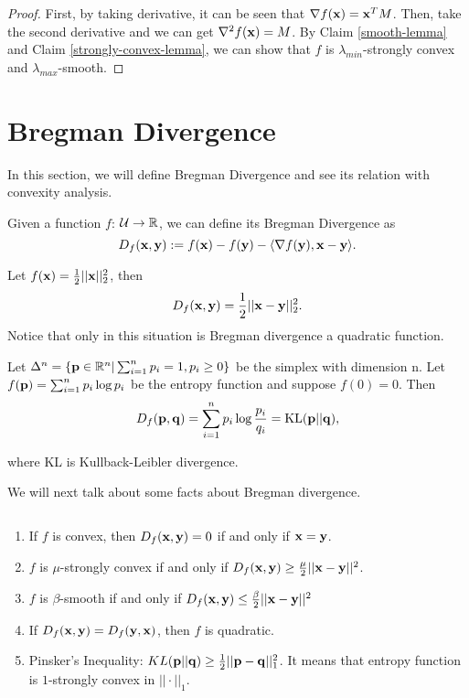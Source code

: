 \documentclass[../main.tex]{subfiles}
\begin{document}
\begin{proof}
	
	First, by taking derivative, it can be seen that $\nabla f(\mathbf{x}) = \mathbf{x}^T M$. Then, take the second derivative and we can get $\nabla^2 f(\mathbf{x}) = M$. By Claim \ref{smooth-lemma} and Claim \ref{strongly-convex-lemma}, we can show that $f$ is $\lambda_{min}$-strongly convex and $\lambda_{max}$-smooth.
\end{proof}

\section{Bregman Divergence}
In this section, we will define Bregman Divergence and see its relation with convexity analysis.

\begin{definition}
	Given a function $f$: $\mathcal{U} \to \mathbb{R}$, we can define its Bregman Divergence as
	\begin{equation}
		D_f(\mathbf{x}, \mathbf{y}) := f(\mathbf{x}) - f(\mathbf{y}) - \langle \nabla f(\mathbf{y}), \mathbf{x} - \mathbf{y} \rangle.
	\end{equation}
\end{definition}

\begin{example}
		Let $f(\mathbf{x}) = \frac{1}{2} ||\mathbf{x}||_2^2$, then
		\begin{equation*}
		D_f(\mathbf{x}, \mathbf{y}) = \frac{1}{2} ||\mathbf{x} - \mathbf{y}||_2^2.
		\end{equation*}
		Notice that only in this situation is Bregman divergence a quadratic function.
\end{example}

\begin{example}
	Let $\Delta^n = \{\mathbf{p} \in \mathbb{R}^n| \sum_{i=1}^n p_i = 1, p_i \geq 0\}$ be the simplex with dimension n. Let $f(\mathbf{p}) = \sum_{i=1}^n p_i\log p_i$ be the entropy function and suppose $f(0) = 0$. Then
	\begin{equation*}
	D_f(\mathbf{p},\mathbf{q}) = \sum\limits_{i=1}^n p_i\log \frac{p_i}{q_i} = \textmd{KL}(\mathbf{p} || \mathbf{q}),
	\end{equation*}
	
	where KL is Kullback-Leibler divergence.
\end{example}

We will next talk about some facts about Bregman divergence.

\begin{fact} $ $
	\begin{enumerate}
		\item If $f$ is convex, then $D_f (\mathbf{x}, \mathbf{y}) = 0$ if and only if $\mathbf{x}=\mathbf{y}$.
		\item $f$ is $\mu$-strongly convex if and only if $D_f(\mathbf{x}, \mathbf{y}) \geq \frac{\mu}{2} ||\mathbf{x}-\mathbf{y}||^2$.
		\item $f$ is $\beta$-smooth if and only if $D_f(\mathbf{x}, \mathbf{y}) \leq \frac{\beta}{2} ||\mathbf{x} - \mathbf{y}||^2$
		\item If $D_f(\mathbf{x}, \mathbf{y}) = D_f(\mathbf{y}, \mathbf{x})$, then $f$ is quadratic.
		\item Pinsker's Inequality: $KL(\mathbf{p}|| \mathbf{q}) \geq \frac{1}{2} ||\mathbf{p} - \mathbf{q}||_1^2$. It means that entropy function is $1$-strongly convex in $||\cdot||_1$.
	\end{enumerate}
\end{fact}
\end{document}
